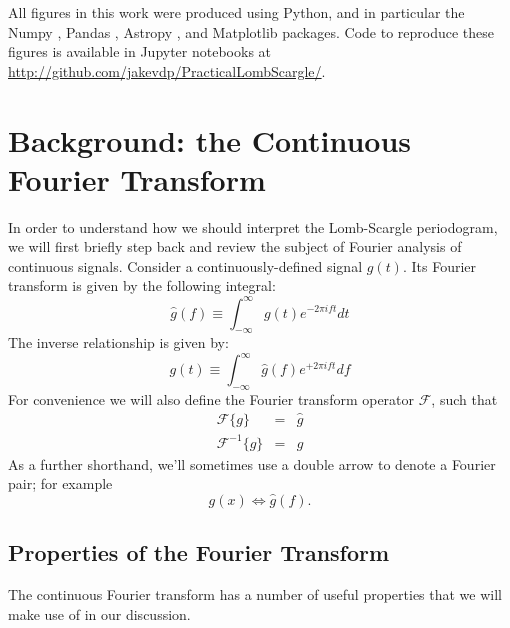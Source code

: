 \documentclass[preprint]{aastex}
\newcommand{\eqlabel}[1]{\label{eq:#1}}
\newcommand{\sectlabel}[1]{\label{sect:#1}}
\begin{document}
All figures in this work were produced using Python, and in particular the
Numpy \citep{numpy, numpybook},
Pandas \citep{pandas},
Astropy \citep{Astropy2013},
and Matplotlib \citep{matplotlib} packages.
Code to reproduce these figures is available in Jupyter notebooks at
\url{http://github.com/jakevdp/PracticalLombScargle/}.

\section{Background: the Continuous Fourier Transform}
\sectlabel{continuous-fourier-transform}

In order to understand how we should interpret the Lomb-Scargle periodogram, we will first briefly step back and review the subject of Fourier analysis of continuous signals.
Consider a continuously-defined signal $g(t)$.
Its Fourier transform is given by the following integral:
\begin{equation}
    \hat{g}(f) \equiv \int_{-\infty}^\infty g(t) e^{-2\pi i f t} dt
    \eqlabel{FT-def}
\end{equation}
The inverse relationship is given by:
\begin{equation}
    g(t) \equiv \int_{-\infty}^\infty \hat{g}(f) e^{+2\pi i f t} df
    \eqlabel{IFT-def}
\end{equation}
For convenience we will also define the Fourier transform operator
$\mathcal{F}$, such that
\begin{eqnarray}
    \mathcal{F}\{g\} &=& \hat{g} \\
    \mathcal{F}^{-1}\{\hat{g}\} &=& g
\end{eqnarray}
As a further shorthand, we'll sometimes use a double arrow to denote a Fourier
pair; for example
\begin{equation}
  g(x) \Longleftrightarrow \hat{g}(f).
\end{equation}

\subsection{Properties of the Fourier Transform}

The continuous Fourier transform has a number of useful properties that we will make use of in our discussion.
\end{document}

